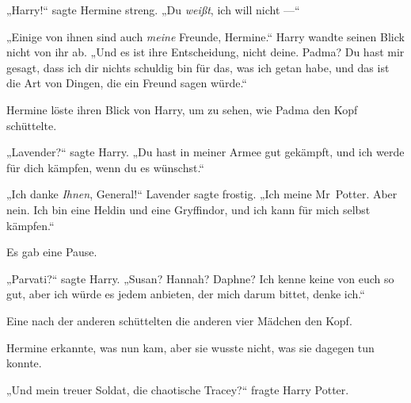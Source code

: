 „Harry!“ sagte Hermine streng.
„Du \emph{weißt}, ich will nicht —“

„Einige von ihnen sind auch \emph{meine} Freunde, Hermine.“ Harry wandte seinen Blick nicht von ihr ab.
„Und es ist ihre Entscheidung, nicht deine. Padma? Du hast mir gesagt, dass ich dir nichts schuldig bin für das, was ich getan habe, und das ist die Art von Dingen, die ein Freund sagen würde.“

Hermine löste ihren Blick von Harry, um zu sehen, wie Padma den Kopf schüttelte.

„Lavender?“ sagte Harry.
„Du hast in meiner Armee gut gekämpft, und ich werde für dich kämpfen, wenn du es wünschst.“

„Ich danke \emph{Ihnen}, General!“ Lavender sagte frostig.
„Ich meine Mr~Potter. Aber nein. Ich bin eine Heldin und eine Gryffindor, und ich kann für mich selbst kämpfen.“

Es gab eine Pause.

„Parvati?“ sagte Harry.
„Susan? Hannah? Daphne? Ich kenne keine von euch so gut, aber ich würde es jedem anbieten, der mich darum bittet, denke ich.“

Eine nach der anderen schüttelten die anderen vier Mädchen den Kopf.

Hermine erkannte, was nun kam, aber sie wusste nicht, was sie dagegen tun konnte.

„Und mein treuer Soldat, die chaotische Tracey?“ fragte Harry Potter.

